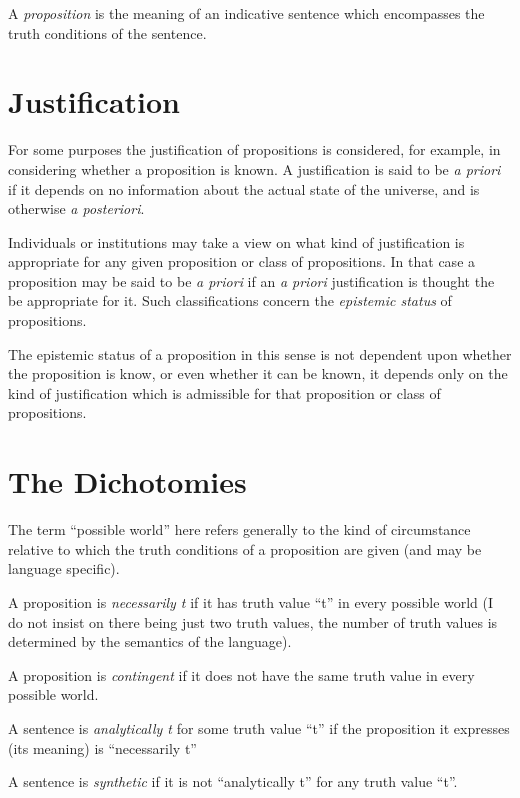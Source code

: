 A {\it proposition} is the meaning of an indicative sentence which encompasses the truth conditions of the sentence.

\section{Justification}

For some purposes the justification of propositions is considered, for example, in considering whether a proposition is known.
A justification is said to be {\it a priori} if it depends on no information about the actual state of the universe, and is otherwise {\it a posteriori}.

Individuals or institutions may take a view on what kind of justification is appropriate for any given proposition or class of propositions.
In that case a proposition may be said to be {\it a priori} if an {\it a priori} justification is thought the be appropriate for it.
Such classifications concern the {\it epistemic status} of propositions.

The epistemic status of a proposition in this sense is not dependent upon whether the proposition is know, or even whether it can be known, it depends only on the kind of justification which is admissible for that proposition or class of propositions.

\section{The Dichotomies}

The term ``possible world'' here refers generally to the kind of circumstance relative to which the truth conditions of a proposition are given (and may be language specific).

A proposition is {\it necessarily t} if it has truth value ``t'' in every possible world (I do not insist on there being just two truth values, the number of truth values is determined by the semantics of the language).

A proposition is {\it contingent} if it does not have the same truth value in every possible world.

A sentence is {\it analytically t} for some truth value ``t''	if the proposition it expresses (its meaning) is ``necessarily t''

A sentence is {\it synthetic} if it is not ``analytically t'' for any truth value ``t''.

